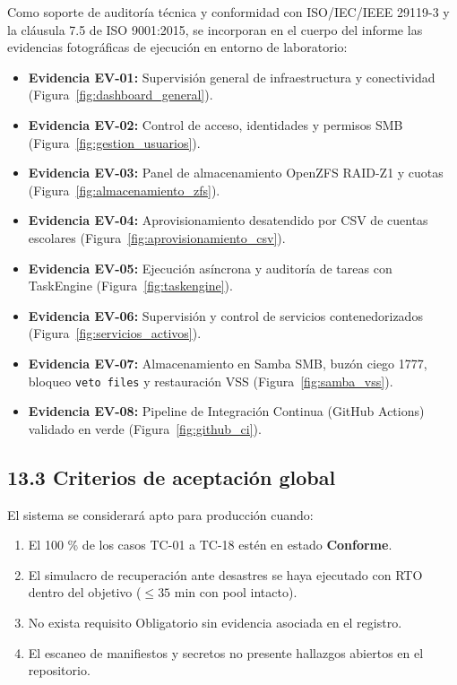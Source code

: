 \documentclass[10pt,a4paper]{article}
\begin{document}
Como soporte de auditoría técnica y conformidad con ISO/IEC/IEEE 29119-3 y la cláusula 7.5 de ISO 9001:2015, se incorporan en el cuerpo del informe las evidencias fotográficas de ejecución en entorno de laboratorio:
\begin{itemize}
    \item \textbf{Evidencia EV-01:} Supervisión general de infraestructura y conectividad (Figura~\ref{fig:dashboard_general}).
    \item \textbf{Evidencia EV-02:} Control de acceso, identidades y permisos SMB (Figura~\ref{fig:gestion_usuarios}).
    \item \textbf{Evidencia EV-03:} Panel de almacenamiento OpenZFS RAID-Z1 y cuotas (Figura~\ref{fig:almacenamiento_zfs}).
    \item \textbf{Evidencia EV-04:} Aprovisionamiento desatendido por CSV de cuentas escolares (Figura~\ref{fig:aprovisionamiento_csv}).
    \item \textbf{Evidencia EV-05:} Ejecución asíncrona y auditoría de tareas con TaskEngine (Figura~\ref{fig:taskengine}).
    \item \textbf{Evidencia EV-06:} Supervisión y control de servicios contenedorizados (Figura~\ref{fig:servicios_activos}).
    \item \textbf{Evidencia EV-07:} Almacenamiento en Samba SMB, buzón ciego 1777, bloqueo \texttt{veto files} y restauración VSS (Figura~\ref{fig:samba_vss}).
    \item \textbf{Evidencia EV-08:} Pipeline de Integración Continua (GitHub Actions) validado en verde (Figura~\ref{fig:github_ci}).
\end{itemize}

\subsection{13.3 Criterios de aceptación global}
El sistema se considerará apto para producción cuando:
\begin{enumerate}
    \item El 100 \% de los casos TC-01 a TC-18 estén en estado \textbf{Conforme}.
    \item El simulacro de recuperación ante desastres se haya ejecutado con RTO dentro del objetivo ($\le 35$ min con pool intacto).
    \item No exista requisito Obligatorio sin evidencia asociada en el registro.
    \item El escaneo de manifiestos y secretos no presente hallazgos abiertos en el repositorio.
\end{enumerate}
\end{document}
